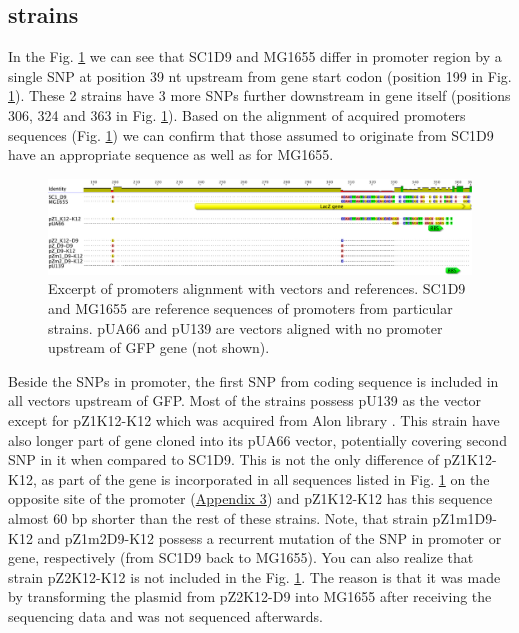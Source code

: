 \subsection{ strains}
In the Fig. \ref{placZ} we can see that SC1\textunderscore D9 and MG1655 differ in  promoter region by a single SNP at position 39 nt upstream from  gene start codon (position 199 in Fig. \ref{placZ}).
These 2 strains have 3 more SNPs further downstream in  gene itself 
(positions 306, 324 and 363 in Fig. \ref{placZ}).
Based on the alignment of acquired  promoters sequences (Fig. \ref{placZ}) we can confirm that those assumed to originate from SC1\textunderscore D9 have an appropriate sequence as well as for MG1655.
\begin{figure}[ht]
  \centering
  \includegraphics[scale=0.25]{text/Pictures/placZsequences.png}
	\caption{Excerpt of  promoters alignment with vectors and references. SC1\textunderscore D9 and MG1655 are reference sequences of  promoters from particular strains. pUA66 and pU139 are vectors aligned with no promoter upstream of GFP gene (not shown).}
	\label{placZ}
\end{figure}
Beside the SNPs in  promoter, the first SNP from  coding sequence is included in all vectors upstream of GFP.
Most of the strains possess pU139 as the vector except for pZ1\textunderscore K12-K12 which was acquired from Alon library \cite{zaslaver2006comprehensive}.
This strain have also longer part of  gene cloned into its pUA66 vector, potentially covering second SNP in it when compared to SC1\textunderscore D9.
This is not the only difference of pZ1\textunderscore K12-K12, as part of the  gene is incorporated in all sequences listed in Fig. \ref{placZ} on the opposite site of the promoter (\hyperlink{placZalign}{Appendix 3}) and pZ1\textunderscore K12-K12 has this  sequence almost 60 bp shorter than the rest of these strains.
Note, that strain pZ1m1\textunderscore D9-K12 and pZ1m2\textunderscore D9-K12 possess a recurrent mutation of the SNP in  promoter or  gene, respectively (from SC1\textunderscore D9 back to MG1655).
You can also realize that strain pZ2\textunderscore K12-K12 is not included in the Fig. \ref{placZ}.
The reason is that it was made by transforming the plasmid from pZ2\textunderscore K12-D9 into MG1655 after receiving the sequencing data and was not sequenced afterwards.

